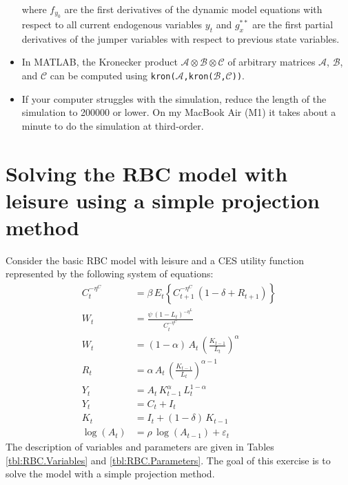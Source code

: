 \documentclass{article}
\begin{document}
\begin{itemize}
\begin{align*}
\end{align*}
where $f_{y_{0}}$ are the first derivatives of the dynamic model equations with respect to all current endogenous variables $y_{t}^{}$
and $g^{**}_{x}$ are the first partial derivatives of the jumper variables with respect to previous state variables.
\item In MATLAB, the Kronecker product $\mathcal{A} \otimes \mathcal{B} \otimes \mathcal{C}$ of arbitrary matrices $\mathcal{A}$, $\mathcal{B}$, and $\mathcal{C}$
  can be computed using \texttt{kron($\mathcal{A}$,kron($\mathcal{B}$,$\mathcal{C}$))}.
\item If your computer struggles with the simulation, reduce the length of the simulation to 200000 or lower.
On my MacBook Air (M1) it takes about a minute to do the simulation at third-order.
\end{itemize}

\newpage

\section[Solving the RBC model with leisure using a simple projection method]{Solving the RBC model with leisure using a simple projection method\label{ex:RBCLeisureProjection}}
Consider the basic RBC model with leisure and a CES utility function represented by the following system of equations:
\begin{align*}
{{C}}_{t}^{-{{\eta^C}}} &={{\beta}}\, E_t \left\{{{C}}_{t+1}^{-{{\eta^C}}}\, \left(1-{{\delta}}+{{R}}_{t+1}\right) \right\}
\\
{{W}}_{t}&=\frac{\psi\, \left(1-{{L}}_{t}\right)^{-{{\eta^L}}}}{{{C}}_{t}^{-{{\eta^C}}}}
\\
{{W}}_{t}&=\left(1-{{\alpha}}\right)\, {{A}}_{t}\, \left(\frac{{{K}}_{t-1}}{{{L}}_{t}}\right)^{{{\alpha}}}
\\
{{R}}_{t}&={{\alpha}}\, {{A}}_{t}\, \left(\frac{{{K}}_{t-1}}{{{L}}_{t}}\right)^{{{\alpha}}-1}
\\
{{Y}}_{t}&={{A}}_{t}\, {{K}}_{t-1}^{{{\alpha}}}\, {{L}}_{t}^{1-{{\alpha}}}
\\
{{Y}}_{t}&={{C}}_{t}+{{I}}_{t}
\\
{{K}}_{t}&={{I}}_{t}+\left(1-{{\delta}}\right)\, {{K}}_{t-1}
\\
\log\left({{A}}_{t}\right)&={{\rho}}\, \log\left({{A}}_{t-1}\right)+{{\varepsilon}}_{t}
\end{align*}
The description of variables and parameters are given in Tables \ref{tbl:RBC.Variables} and \ref{tbl:RBC.Parameters}.
The goal of this exercise is to solve the model with a simple projection method.
\end{document}
